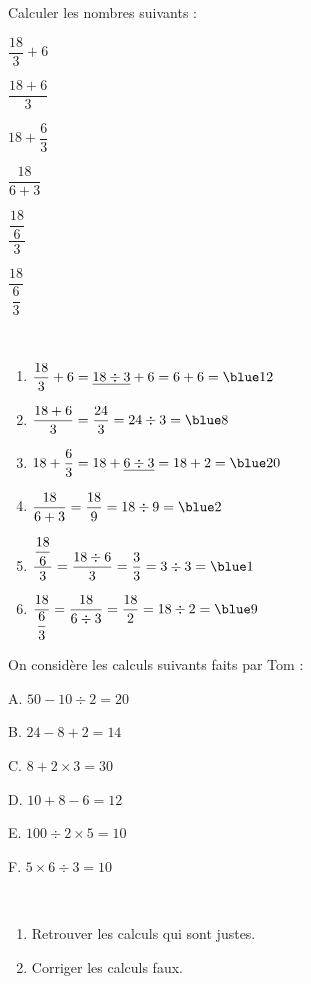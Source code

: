 \begin{colonne*exercice}
\bigskip


\begin{exercice} %
   Calculer les nombres suivants :
   \begin{colenumerate}{3}
      \item $\dfrac{18}{3}+6$ \bigskip
      \item $\dfrac{18+6}{3}$
      \item $18+\dfrac{6}{3}$
      \item $\dfrac{18}{6+3}$
      \item $\dfrac{\dfrac{18}{6}}{3}$
      \item $\dfrac{18}{\dfrac{6}{3}}$
   \end{colenumerate}
\end{exercice}

\begin{corrige}
   \ \\ [-5mm]
   \begin{enumerate}
      \item $\dfrac{18}{3}+6 =\underline{18\div3}+6 =6+6 =\blue 12$ \medskip
      \item $\dfrac{18+6}{3} =\dfrac{24}{3} =24\div3 =\blue 8$ \medskip
      \item $18+\dfrac{6}{3} =18+\underline{6\div3} =18+2 =\blue 20$ \medskip
      \item $\dfrac{18}{6+3} =\dfrac{18}{9} =18\div9 =\blue 2$ \medskip
      \item $\dfrac{\dfrac{18}{6}}{3} =\dfrac{18\div6}{3} =\dfrac{3}{3} =3\div3 =\blue 1$ \medskip
      \item $\dfrac{18}{\dfrac{6}{3}} =\dfrac{18}{6\div3} =\dfrac{18}{2} =18\div2 =\blue 9$
   \end{enumerate}
\end{corrige}

\bigskip


\begin{exercice} %
   On considère les calculs suivants faits par Tom :
   \begin{colitemize}{2}
      \item A. \;$50-10\div2 =20$ \smallskip
      \item B. \;$24-8+2 =14$ \smallskip
      \item C. \;$8+2\times3 =30$
      \item D. \;$10+8-6 =12$
      \item E. \;$100\div2\times5 =10$
      \item F. \;$5\times6\div3 =10$
   \end{colitemize}
   \  \\ [-10mm]
   \begin{enumerate}
      \item Retrouver les calculs qui sont justes.
      \item Corriger les calculs faux.
   \end{enumerate}
\end{exercice}


\end{colonne*exercice}
